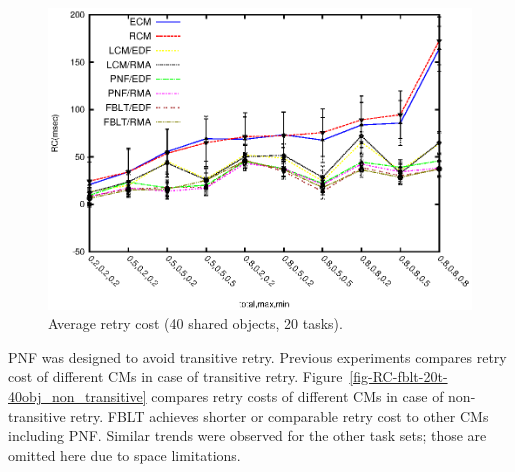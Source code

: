 \documentclass[conference,letterpaper]{IEEEtran}
\begin{document}
%
\begin{figure}
\centering
\includegraphics[scale=0.7]{figures/20_tasks/Abr_Dur/fblt/Abr_dur_20t_420obj_100wr_-1eta}
\caption{Average retry cost (40 shared objects, 20 tasks).}
\label{fig-RC-fblt-20t-40obj}
\end{figure}
%
PNF was designed to avoid transitive retry. Previous experiments compares retry cost of different CMs in case of transitive retry. Figure~\ref{fig-RC-fblt-20t-40obj_non_transitive}
compares retry costs of different CMs in case of non-transitive retry. FBLT achieves shorter or comparable retry cost to other CMs including PNF. Similar trends were observed for the other task sets; those are omitted here due to space limitations.
%

%
\end{document}

